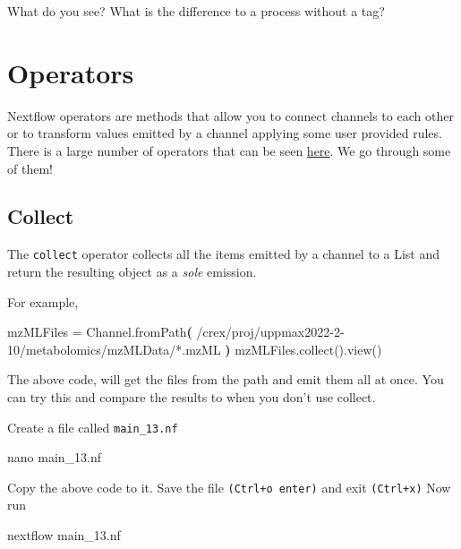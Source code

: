 \documentclass[
]{book}
\newenvironment{Shaded}{\begin{snugshade}}{\end{snugshade}}
\newcommand{\ErrorTok}[1]{\textcolor[rgb]{0.64,0.00,0.00}{\textbf{#1}}}
\newcommand{\ExtensionTok}[1]{#1}
\newcommand{\FunctionTok}[1]{\textcolor[rgb]{0.00,0.00,0.00}{#1}}
\newcommand{\KeywordTok}[1]{\textcolor[rgb]{0.13,0.29,0.53}{\textbf{#1}}}
\newcommand{\NormalTok}[1]{#1}
\newcommand{\StringTok}[1]{\textcolor[rgb]{0.31,0.60,0.02}{#1}}
\begin{document}
What do you see? What is the difference to a process without a tag?

\hypertarget{operators}{%
\chapter{Operators}\label{operators}}

Nextflow operators are methods that allow you to connect channels to each other or to transform values emitted by a channel applying some user provided rules. There is a large number of operators that can be seen \href{https://www.nextflow.io/docs/latest/operator.html}{here}. We go through some of them!

\hypertarget{collect}{%
\section{Collect}\label{collect}}

The \texttt{collect} operator collects all the items emitted by a channel to a List and return the resulting object as a \emph{sole} emission.

For example,

\begin{Shaded}
\begin{Highlighting}[numbers=left,,]
\ExtensionTok{mzMLFiles}\NormalTok{ = Channel.fromPath}\ErrorTok{(} \StringTok{\textquotesingle{}/crex/proj/uppmax2022{-}2{-}10/metabolomics/mzMLData/*.mzML\textquotesingle{}} \KeywordTok{)}
\FunctionTok{mzMLFiles.collect().view()}
\end{Highlighting}
\end{Shaded}

The above code, will get the files from the path and emit them all at once. You can try this and compare the results to when you don't use collect.

Create a file called \texttt{main\_13.nf}

\begin{Shaded}
\begin{Highlighting}[numbers=left,,]
\FunctionTok{nano}\NormalTok{ main\_13.nf}
\end{Highlighting}
\end{Shaded}

Copy the above code to it. Save the file \texttt{(Ctrl+o\ enter)} and exit \texttt{(Ctrl+x)}
Now run

\begin{Shaded}
\begin{Highlighting}[numbers=left,,]
\ExtensionTok{nextflow}\NormalTok{ main\_13.nf}
\end{Highlighting}
\end{Shaded}
\end{document}
